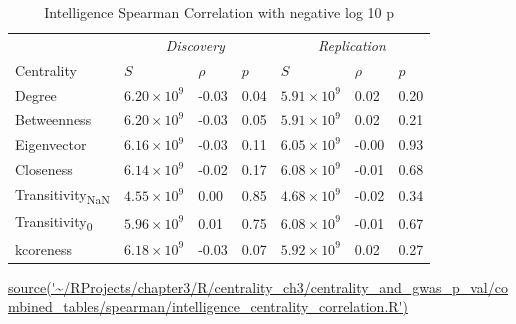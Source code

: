 \clearpage

\begin{table}[ht]
\centering
\setlength{\extrarowheight}{2pt}
\begin{tabular}{l@{\hskip 20pt}lll@{\hskip 20pt}lll}
  \toprule
  &  \multicolumn{3}{c}{\textit{Discovery}} & \multicolumn{3}{c}{\textit{Replication}} \\
  \cmidrule{2-7}
Centrality & $S$ & $\rho$ & $p$ & $S$ & $\rho$ & $p$ \\ 
  \midrule
Degree & $6.20 \times 10^{9}$ & -0.03 & 0.04 & $5.91 \times 10^{9}$ & 0.02 & 0.20 \\ 
  Betweenness & $6.20 \times 10^{9}$ & -0.03 & 0.05 & $5.91 \times 10^{9}$ & 0.02 & 0.21 \\ 
  Eigenvector & $6.16 \times 10^{9}$ & -0.03 & 0.11 & $6.05 \times 10^{9}$ & -0.00 & 0.93 \\ 
  Closeness & $6.14 \times 10^{9}$ & -0.02 & 0.17 & $6.08 \times 10^{9}$ & -0.01 & 0.68 \\ 
  Transitivity\textsubscript{NaN} & $4.55 \times 10^{9}$ & 0.00 & 0.85 & $4.68 \times 10^{9}$ & -0.02 & 0.34 \\ 
  Transitivity\textsubscript{0} & $5.96 \times 10^{9}$ & 0.01 & 0.75 & $6.08 \times 10^{9}$ & -0.01 & 0.67 \\ 
  kcoreness & $6.18 \times 10^{9}$ & -0.03 & 0.07 & $5.92 \times 10^{9}$ & 0.02 & 0.27 \\ 
   \bottomrule
\end{tabular}
\caption{Intelligence Spearman Correlation with negative log 10 p } 
\tiny\url{source('~/RProjects/chapter3/R/centrality_ch3/centrality_and_gwas_p_val/combined_tables/spearman/intelligence_centrality_correlation.R')}
\label{tab:Intelligence Spearman Correlation}
\end{table}

